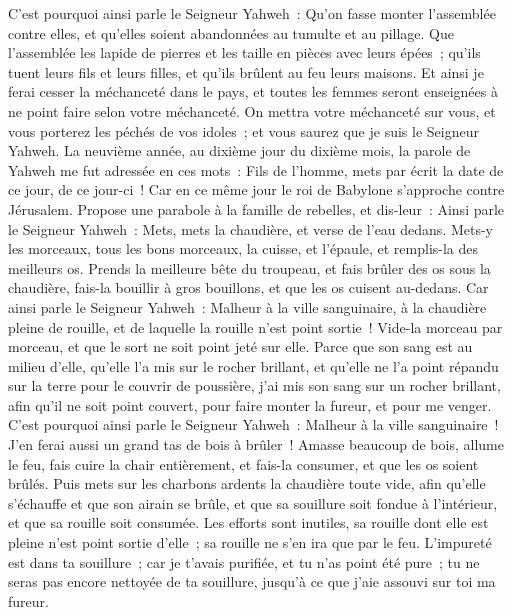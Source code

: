 \begin{multicols}{2}
C'est pourquoi ainsi parle le Seigneur Yahweh~: Qu'on fasse monter l'assemblée contre elles, et qu'elles soient abandonnées au tumulte et au pillage.
Que l'assemblée les lapide de pierres et les taille en pièces avec leurs épées~; qu'ils tuent leurs fils et leurs filles, et qu'ils brûlent au feu leurs maisons.
Et ainsi je ferai cesser la méchanceté dans le pays, et toutes les femmes seront enseignées à ne point faire selon votre méchanceté.
On mettra votre méchanceté sur vous, et vous porterez les péchés de vos idoles~; et vous saurez que je suis le Seigneur Yahweh.
\VerseOne{}La neuvième année, au dixième jour du dixième mois, la parole de Yahweh me fut adressée en ces mots~:
Fils de l'homme, mets par écrit la date de ce jour, de ce jour-ci~! Car en ce même jour le roi de Babylone s'approche contre Jérusalem.
Propose une parabole à la famille de rebelles, et dis-leur~: Ainsi parle le Seigneur Yahweh~: Mets, mets la chaudière, et verse de l'eau dedans.
Mets-y les morceaux, tous les bons morceaux, la cuisse, et l'épaule, et remplis-la des meilleurs os.
Prends la meilleure bête du troupeau, et fais brûler des os sous la chaudière, fais-la bouillir à gros bouillons, et que les os cuisent au-dedans.
Car ainsi parle le Seigneur Yahweh~: Malheur à la ville sanguinaire, à la chaudière pleine de rouille, et de laquelle la rouille n'est point sortie~! Vide-la morceau par morceau, et que le sort ne soit point jeté sur elle.
Parce que son sang est au milieu d'elle, qu'elle l'a mis sur le rocher brillant, et qu'elle ne l'a point répandu sur la terre pour le couvrir de poussière,
j'ai mis son sang sur un rocher brillant, afin qu'il ne soit point couvert, pour faire monter la fureur, et pour me venger.
C'est pourquoi ainsi parle le Seigneur Yahweh~: Malheur à la ville sanguinaire~! J'en ferai aussi un grand tas de bois à brûler~!
Amasse beaucoup de bois, allume le feu, fais cuire la chair entièrement, et fais-la consumer, et que les os soient brûlés.
Puis mets sur les charbons ardents la chaudière toute vide, afin qu'elle s'échauffe et que son airain se brûle, et que sa souillure soit fondue à l'intérieur, et que sa rouille soit consumée.
Les efforts sont inutiles, sa rouille dont elle est pleine n'est point sortie d'elle~; sa rouille ne s'en ira que par le feu.
L'impureté est dans ta souillure~; car je t'avais purifiée, et tu n'as point été pure~; tu ne seras pas encore nettoyée de ta souillure, jusqu'à ce que j'aie assouvi sur toi ma fureur.

\end{multicols}
